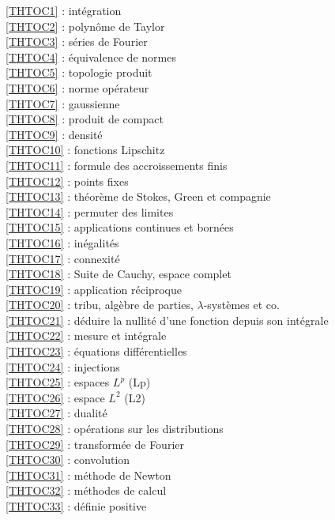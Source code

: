 \ref {THTOC1} : intégration\\
\ref {THTOC2} : polynôme de Taylor\\
\ref {THTOC3} : séries de Fourier\\
\ref {THTOC4} : équivalence de normes\\
\ref {THTOC5} : topologie produit\\
\ref {THTOC6} : norme opérateur\\
\ref {THTOC7} : gaussienne\\
\ref {THTOC8} : produit de compact\\
\ref {THTOC9} : densité\\
\ref {THTOC10} : fonctions Lipschitz\\
\ref {THTOC11} : formule des accroissements finis\\
\ref {THTOC12} : points fixes\\
\ref {THTOC13} : théorème de Stokes, Green et compagnie\\
\ref {THTOC14} : permuter des limites\\
\ref {THTOC15} : applications continues et bornées\\
\ref {THTOC16} : inégalités\\
\ref {THTOC17} : connexité\\
\ref {THTOC18} : Suite de Cauchy, espace complet\\
\ref {THTOC19} : application réciproque\\
\ref {THTOC20} : tribu, algèbre de parties, \( \lambda \)-systèmes et co.\\
\ref {THTOC21} : déduire la nullité d'une fonction depuis son intégrale\\
\ref {THTOC22} : mesure et intégrale\\
\ref {THTOC23} : équations différentielles\\
\ref {THTOC24} : injections\\
\ref {THTOC25} : espaces \( L^p\) (Lp)\\
\ref {THTOC26} : espace \( L^2\) (L2)\\
\ref {THTOC27} : dualité\\
\ref {THTOC28} : opérations sur les distributions\\
\ref {THTOC29} : transformée de Fourier\\
\ref {THTOC30} : convolution\\
\ref {THTOC31} : méthode de Newton\\
\ref {THTOC32} : méthodes de calcul\\
\ref {THTOC33} : définie positive\\
